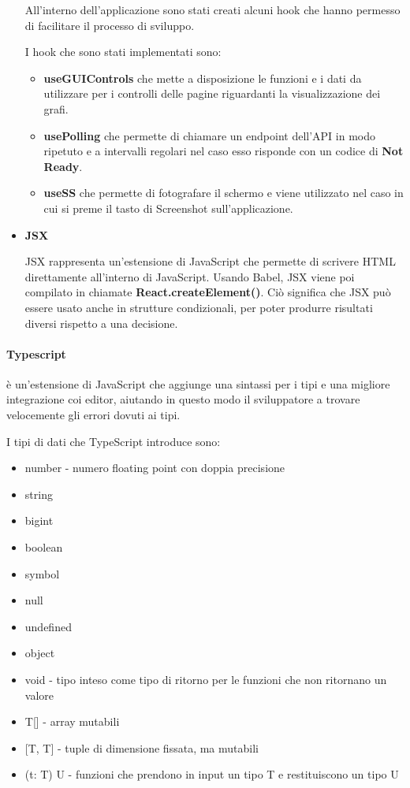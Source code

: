 \documentclass[a4paper,12pt]{report}
\begin{document}
\begin{itemize}
\begin{itemize}
				\end{itemize}
				
				All'interno dell'applicazione sono stati creati alcuni hook che hanno permesso di facilitare il processo di sviluppo. 

				I hook che sono stati implementati sono:
				\begin{itemize}
				\item \textbf{useGUIControls} che mette a disposizione le funzioni e i dati da utilizzare per i controlli delle pagine riguardanti la visualizzazione dei grafi.
				
				\item \textbf{usePolling} che permette di chiamare un endpoint dell'API in modo ripetuto e a intervalli regolari nel caso esso risponde con un codice di \textbf{Not Ready}.
				
				\item \textbf{useSS} che permette di fotografare il schermo e viene utilizzato nel caso in cui si preme il tasto di Screenshot sull'applicazione.			
				\end{itemize}				

				\item \textbf{JSX}

				JSX rappresenta un'estensione di JavaScript che permette di scrivere HTML direttamente all'interno di JavaScript. Usando Babel, JSX viene poi compilato in chiamate \textbf{React.createElement()}. Ciò significa che JSX può essere usato anche in strutture condizionali, per poter produrre risultati diversi rispetto a una decisione. \cite{jsxreact} 

				\end{itemize}
			\paragraph*{Typescript} è un'estensione di JavaScript che aggiunge una sintassi per i tipi e una migliore integrazione coi editor, aiutando in questo modo il sviluppatore a trovare velocemente gli errori dovuti ai tipi. \cite{typescript} 

				I tipi di dati che TypeScript introduce sono:
				\begin{itemize}
				\item number - numero floating point con doppia precisione
				\item string
				\item bigint
 				\item boolean
				\item symbol
				\item null
				\item undefined
				\item object
				\item void - tipo inteso come tipo di ritorno per le funzioni che non ritornano un valore
				\item T[] - array mutabili
				\item {[T, T]} - tuple di dimensione fissata, ma mutabili
				\item (t: T) U - funzioni che prendono in input un tipo T e restituiscono un tipo U
				\end{itemize}
\end{document}
